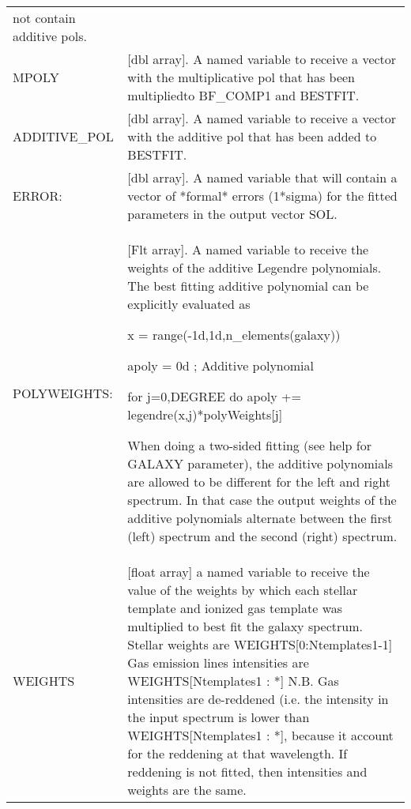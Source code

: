 \begin{center}
\begin{longtable}{p{2.7cm}| p{11.1cm}}
       not contain additive pols.\\
%
 MPOLY &[dbl array]. A  named variable to receive a vector with the multiplicative
       pol that has been multipliedto BF\_COMP1 and BESTFIT.\\
%
 ADDITIVE\_POL &[dbl array]. A  named variable to receive a vector with the additive
      pol that has been added to BESTFIT. \\
%
ERROR: &[dbl array]. A  named variable that will contain a vector of *formal* errors
       (1*sigma) for the fitted parameters in the output vector SOL.\\
%
POLYWEIGHTS: &[Flt array]. A named variable to receive the weights of the additive Legendre polynomials.
       The best fitting additive polynomial can be explicitly evaluated as

           x = range(-1d,1d,n\_elements(galaxy))

           apoly = 0d ; Additive polynomial

           for j=0,DEGREE do apoly += legendre(x,j)*polyWeights[j]

     When doing a two-sided fitting (see help for GALAXY parameter), the additive
       polynomials are allowed to be different for the left and right spectrum.
       In that case the output weights of the additive polynomials alternate between
       the first (left) spectrum and the second (right) spectrum.\\
%
   WEIGHTS  &[float array] a named variable to receive the value of the weights by which each stellar
       template and ionized gas template was multiplied to best fit
       the galaxy spectrum.
        Stellar weights are WEIGHTS[0:Ntemplates1-1]
        Gas emission lines intensities are  WEIGHTS[Ntemplates1 : *]
        N.B. Gas intensities are de-reddened (i.e. the intensity in
        the input spectrum is lower than WEIGHTS[Ntemplates1 : *],
        because it account for the reddening at that wavelength.
        If reddening is not fitted, then intensities and weights
        are the same.\\
%
\hline
\end{longtable}
\end{center}

